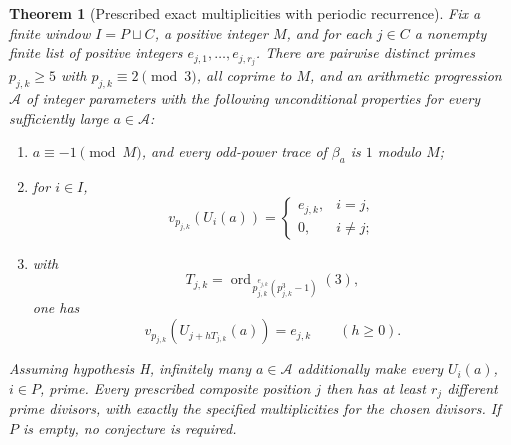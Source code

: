 \documentclass[11pt,a4paper]{article}
\newtheorem{theorem}{Theorem}[section]
\theoremstyle{definition}\newtheorem{definition}[theorem]{Definition}
\theoremstyle{remark}\newtheorem{remark}[theorem]{Remark}
\begin{document}
\begin{theorem}[Prescribed exact multiplicities with periodic recurrence]
\label{pis:fac:valuationpatterns}
Fix a finite window $I=P\sqcup C$, a positive integer $M$, and for each
$j\in C$ a nonempty finite list of positive integers
$e_{j,1},\ldots,e_{j,r_j}$. There are pairwise distinct primes
$p_{j,k}\ge5$ with $p_{j,k}\equiv2\pmod3$, all coprime to $M$, and an arithmetic progression
$\mathcal A$ of integer parameters with the following unconditional
properties for every sufficiently large $a\in\mathcal A$:
\begin{enumerate}
\item $a\equiv-1\pmod M$, and every odd-power trace of $\beta_a$ is
$1$ modulo $M$;
\item for $i\in I$,
\[
 v_{p_{j,k}}(U_i(a))=
 \begin{cases}e_{j,k},&i=j,\\0,&i\ne j;\end{cases}
\]
\item with
\[
 T_{j,k}=\operatorname{ord}_{\,p_{j,k}^{e_{j,k}}
                      (p_{j,k}^3-1)}(3),
\]
one has
\[
 v_{p_{j,k}}(U_{j+hT_{j,k}}(a))=e_{j,k}\qquad(h\ge0).
\]
\end{enumerate}
Assuming hypothesis H, infinitely many $a\in\mathcal A$ additionally
make every $U_i(a)$, $i\in P$, prime. Every prescribed composite position
$j$ then has at least $r_j$ different prime divisors, with exactly the
specified multiplicities for the chosen divisors. If $P$ is empty,
no conjecture is required.
\end{theorem}
\end{document}
